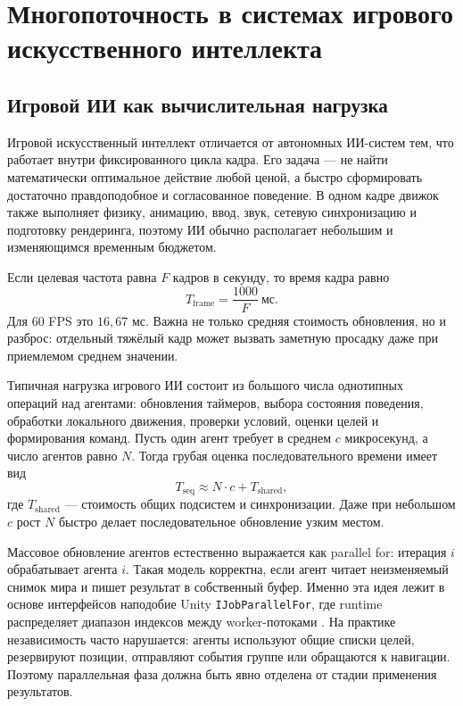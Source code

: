 \documentclass[14pt,a4paper,oneside]{extreport}
\begin{document}
\chapter{Многопоточность в системах игрового искусственного интеллекта}

\section{Игровой ИИ как вычислительная нагрузка}

Игровой искусственный интеллект отличается от автономных ИИ-систем тем, что работает внутри фиксированного цикла кадра. Его задача --- не найти математически оптимальное действие любой ценой, а быстро сформировать достаточно правдоподобное и согласованное поведение. В одном кадре движок также выполняет физику, анимацию, ввод, звук, сетевую синхронизацию и подготовку рендеринга, поэтому ИИ обычно располагает небольшим и изменяющимся временным бюджетом.

Если целевая частота равна \(F\) кадров в секунду, то время кадра равно
\begin{equation}
T_{\text{frame}} = \frac{1000}{F}\ \text{мс}.
\end{equation}
Для 60 FPS это \(16{,}67\) мс. Важна не только средняя стоимость обновления, но и разброс: отдельный тяжёлый кадр может вызвать заметную просадку даже при приемлемом среднем значении.

Типичная нагрузка игрового ИИ состоит из большого числа однотипных операций над агентами: обновления таймеров, выбора состояния поведения, обработки локального движения, проверки условий, оценки целей и формирования команд. Пусть один агент требует в среднем \(c\) микросекунд, а число агентов равно \(N\). Тогда грубая оценка последовательного времени имеет вид
\begin{equation}
T_{\text{seq}} \approx N \cdot c + T_{\text{shared}},
\end{equation}
где \(T_{\text{shared}}\) --- стоимость общих подсистем и синхронизации. Даже при небольшом \(c\) рост \(N\) быстро делает последовательное обновление узким местом.

Массовое обновление агентов естественно выражается как parallel for: итерация \(i\) обрабатывает агента \(i\). Такая модель корректна, если агент читает неизменяемый снимок мира и пишет результат в собственный буфер. Именно эта идея лежит в основе интерфейсов наподобие Unity \texttt{IJobParallelFor}, где runtime распределяет диапазон индексов между worker-потоками \cite{unity_ijobparallelfor,unity_parallel_for_jobs}. На практике независимость часто нарушается: агенты используют общие списки целей, резервируют позиции, отправляют события группе или обращаются к навигации. Поэтому параллельная фаза должна быть явно отделена от стадии применения результатов.
\end{document}
